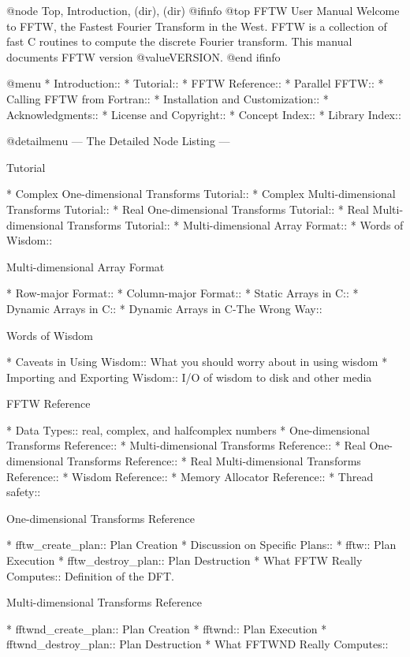 @node    Top, Introduction, (dir), (dir)
@ifinfo
@top FFTW User Manual
Welcome to FFTW, the Fastest Fourier Transform in the West.  FFTW is a
collection of fast C routines to compute the discrete Fourier transform.
This manual documents FFTW version @value{VERSION}.
@end ifinfo

@menu
* Introduction::                
* Tutorial::                    
* FFTW Reference::              
* Parallel FFTW::               
* Calling FFTW from Fortran::   
* Installation and Customization::  
* Acknowledgments::             
* License and Copyright::       
* Concept Index::               
* Library Index::               

@detailmenu --- The Detailed Node Listing ---

Tutorial

* Complex One-dimensional Transforms Tutorial::  
* Complex Multi-dimensional Transforms Tutorial::  
* Real One-dimensional Transforms Tutorial::  
* Real Multi-dimensional Transforms Tutorial::  
* Multi-dimensional Array Format::  
* Words of Wisdom::             

Multi-dimensional Array Format

* Row-major Format::            
* Column-major Format::         
* Static Arrays in C::          
* Dynamic Arrays in C::         
* Dynamic Arrays in C-The Wrong Way::  

Words of Wisdom

* Caveats in Using Wisdom::     What you should worry about in using wisdom
* Importing and Exporting Wisdom::  I/O of wisdom to disk and other media

FFTW Reference

* Data Types::                  real, complex, and halfcomplex numbers
* One-dimensional Transforms Reference::  
* Multi-dimensional Transforms Reference::  
* Real One-dimensional Transforms Reference::  
* Real Multi-dimensional Transforms Reference::  
* Wisdom Reference::            
* Memory Allocator Reference::  
* Thread safety::               

One-dimensional Transforms Reference

* fftw_create_plan::            Plan Creation
* Discussion on Specific Plans::  
* fftw::                        Plan Execution
* fftw_destroy_plan::           Plan Destruction
* What FFTW Really Computes::   Definition of the DFT.

Multi-dimensional Transforms Reference

* fftwnd_create_plan::          Plan Creation
* fftwnd::                      Plan Execution
* fftwnd_destroy_plan::         Plan Destruction
* What FFTWND Really Computes::  

